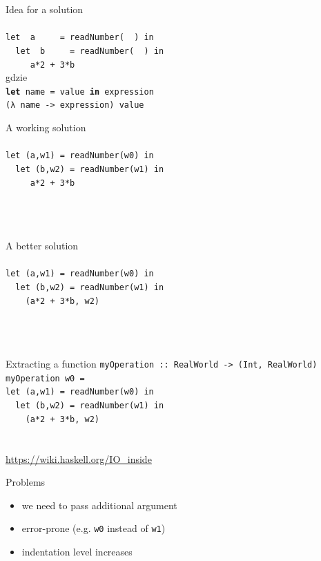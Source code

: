 \documentclass{beamer}
\begin{document}
\begin{frame}{Idea for a solution}
  \texttt{ \\ \ \\
    let \ a\ \ \ \ \  = readNumber(\ \ ) in \\ \pause
    \ \ let \ b\ \ \ \ \ = readNumber(\ \ ) in \\ \pause
    \ \ \ \ \ a*2 + 3*b
  } \\ \pause gdzie \\
  \texttt{\textbf{let} name = value \textbf{in} expression} \\ 
  \texttt{(λ name -> expression) value}
\end{frame}


\begin{frame}{A working solution}
  \texttt{ \\ \ \\
    let (a,w1) = readNumber(w0) in \\
    \ \ let (b,w2) = readNumber(w1) in \\
    \ \ \ \ \ a*2 + 3*b
  } \\ \ \\ \ \\ \ 
\end{frame}

\begin{frame}{A better solution}
  \texttt{ \\ \ \\
    let (a,w1) = readNumber(w0) in \\
    \ \ let (b,w2) = readNumber(w1) in \\
    \ \ \ \ (a*2 + 3*b, w2)
  } \\ \ \\ \ \\ \ 
\end{frame}

\begin{frame}{Extracting a function}
  \texttt{myOperation ::\ RealWorld -> (Int, RealWorld)
    myOperation w0 = \\
    let (a,w1) = readNumber(w0) in \\
    \ \ let (b,w2) = readNumber(w1) in \\
    \ \ \ \ (a*2 + 3*b, w2)
  } \\ \ \\ \ \\ \url{https://wiki.haskell.org/IO_inside}
\end{frame}

\begin{frame}{Problems}
  \pause
  \begin{itemize}
  \item we need to pass additional argument \pause
  \item error-prone (e.g. \texttt{w0} instead of \texttt{w1}) \pause
  \item indentation level increases
  \end{itemize}
\end{frame}
\end{document}

